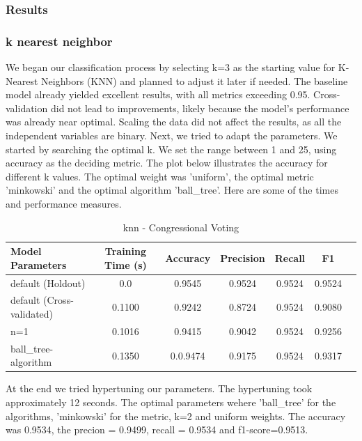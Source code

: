 \documentclass{article}
\begin{document}
\subsubsection{Results}
\subsubsection*{k nearest neighbor}
We began our classification process by selecting k=3 as the starting value for K-Nearest Neighbors (KNN) and planned to adjust it later if needed. The baseline model already yielded excellent results, with all metrics exceeding 0.95. Cross-validation did not lead to improvements, likely because the model's performance was already near optimal. Scaling the data did not affect the results, as all the independent variables are binary. 
Next, we tried to adapt the parameters. We started by searching the optimal k. We set the range between 1 and 25, using accuracy as the deciding metric. The plot below illustrates the accuracy for different k values. The optimal weight was 'uniform', the optimal metric 'minkowski' and the optimal algorithm 'ball\_tree'.
Here are some of the times and performance measures.

\begin{table}[H]
\centering
\begin{tabular}{l|c|c|c|c|c|c}
\textbf{Model Parameters} & \textbf{Training Time (s)} & \textbf{Accuracy} & \textbf{Precision} & \textbf{Recall} & \textbf{F1} \\\hline
default (Holdout) & 0.0 & 0.9545 & 0.9524 & 0.9524 & 0.9524 \\
default (Cross-validated) & 0.1100  & 0.9242 & 0.8724 & 0.9524 & 0.9080\\
n=1 & 0.1016  & 0.9415 & 0.9042 & 0.9524 & 0.9256 \\
ball\_tree-algorithm & 0.1350  & 0.0.9474 & 0.9175 &0.9524 & 0.9317 \\
\end{tabular}
\caption{knn - Congressional Voting}
\label{tab:knn - Congressional Voting}
\end{table}

At the end we tried hypertuning our parameters. The hypertuning took approximately 12 seconds. The optimal parameters wehere 'ball\_tree' for the algorithms, 'minkowski' for the metric, k=2 and uniform weights. The accuracy was 0.9534, the precion = 0.9499, recall = 0.9534 and f1-score=0.9513.
\end{document}
